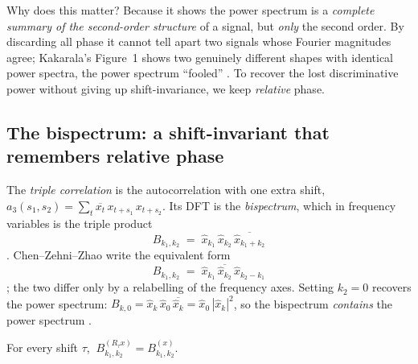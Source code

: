 Why does this matter? Because it shows the power spectrum is a \emph{complete summary of
the second-order structure} of a signal, but \emph{only} the second order. By
discarding all phase it cannot tell apart two signals whose Fourier magnitudes agree;
Kakarala's Figure~1 shows two genuinely different shapes with identical power spectra,
the power spectrum ``fooled'' \citep{invariants_kakarala}. To recover the lost
discriminative power without giving up shift-invariance, we keep \emph{relative} phase.

\subsection{The bispectrum: a shift-invariant that remembers relative phase}

\begin{definition}
\label{def:bispec}
The \emph{triple correlation} is the autocorrelation with one extra shift,
$a_3(s_1,s_2) = \sum_t \overline{x_t}\, x_{t+s_1}\, x_{t+s_2}$. Its DFT is the
\emph{bispectrum}, which in frequency variables is the triple product
\[
  B_{k_1,k_2} \;=\; \widehat x_{k_1}\,\widehat x_{k_2}\,\overline{\widehat x_{k_1+k_2}}
\]
\citep{invariants_kakarala,wiki_bispectrum}. Chen--Zehni--Zhao write the equivalent form
\[
  B_{k_1,k_2} \;=\; \widehat x_{k_1}\,\overline{\widehat x_{k_2}}\,\widehat x_{k_2-k_1}
\]
\citep{invariants_chen}; the two differ only by a relabelling of the frequency axes. Setting
$k_2 = 0$ recovers the power spectrum: $B_{k,0} = \widehat x_k\,\widehat x_0\,
\overline{\widehat x_k} = \widehat x_0\,|\widehat x_k|^2$, so the bispectrum
\emph{contains} the power spectrum \citep{invariants_kakarala}.
\end{definition}

\begin{theorem}
\label{thm:bispecinv}
For every shift $\tau$, $\ B^{(R_\tau x)}_{k_1,k_2} = B^{(x)}_{k_1,k_2}$.
\end{theorem}

